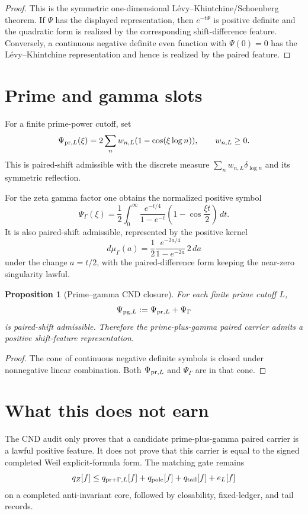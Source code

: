 \documentclass[11pt]{article}
\newtheorem{proposition}{Proposition}
\begin{document}
\begin{proof}
This is the symmetric one-dimensional L\'evy--Khintchine/Schoenberg theorem.  If
\(\Psi\) has the displayed representation, then
\(e^{-t\Psi}\) is positive definite and the quadratic form is realized by the
corresponding shift-difference feature.  Conversely, a continuous negative definite
even function with \(\Psi(0)=0\) has the L\'evy--Khintchine representation and hence
is realized by the paired feature.
\end{proof}

\section{Prime and gamma slots}
For a finite prime-power cutoff, set
\[
        \Psi_{{\rm pr},L}(\xi)
        =2\sum_n w_{n,L}(1-\cos(\xi\log n)),
        \qquad
        w_{n,L}\ge0.
\]
This is paired-shift admissible with the discrete measure
\(\sum_n w_{n,L}\delta_{\log n}\) and its symmetric reflection.

For the zeta gamma factor one obtains the normalized positive symbol
\[
        \Psi_\Gamma(\xi)
        =\frac12\int_0^\infty \frac{e^{-t/4}}{1-e^{-t}}
          \left(1-\cos\frac{\xi t}{2}\right)\,dt.
\]
It is also paired-shift admissible, represented by the positive kernel
\[
        d\mu_\Gamma(a)
        =\frac12\frac{e^{-2a/4}}{1-e^{-2a}}\,2\,da
\]
under the change \(a=t/2\), with the paired-difference form keeping the near-zero
singularity lawful.

\begin{proposition}[Prime--gamma CND closure]
For each finite prime cutoff \(L\),
\[
        \Psi_{{\rm pg},L}:=\Psi_{{\rm pr},L}+\Psi_\Gamma
\]
is paired-shift admissible.  Therefore the prime-plus-gamma paired carrier admits a
positive shift-feature representation.
\end{proposition}

\begin{proof}
The cone of continuous negative definite symbols is closed under nonnegative linear
combination.  Both \(\Psi_{{\rm pr},L}\) and \(\Psi_\Gamma\) are in that cone.
\end{proof}

\section{What this does not earn}
The CND audit only proves that a candidate prime-plus-gamma paired carrier is a
lawful positive feature.  It does not prove that this carrier is equal to the signed
completed Weil explicit-formula form.  The matching gate remains
\[
        q_Z[f]\le q_{{\rm pr}+\Gamma,L}[f]+q_{\rm pole}[f]+q_{\rm tail}[f]+e_L[f]
\]
on a completed anti-invariant core, followed by closability, fixed-ledger, and tail
records.
\end{document}
